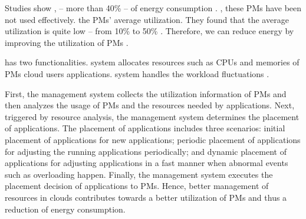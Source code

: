 Studies show \cite{Barroso:2007jt, Shen:2015hm},   -- more than 40\% -- of energy consumption . ,
these PMs have been not used effectively. the PMs' average utilization. They found that the average utilization is quite low 
-- from 10\% to 50\% \cite{Hameed:2016cmb}.
Therefore, we can reduce energy by improving the utilization of PMs .

has two  functionalities.  system 
allocates resources such as CPUs and memories of PMs  cloud users  applications.  system 
handles the workload fluctuations .  

First, the management system collects the utilization information of PMs and then 
analyzes the usage of PMs and the resources needed by applications. Next, triggered by resource analysis, the management system determines the 
placement of applications. The placement of applications includes three scenarios: initial placement of applications for new applications; periodic placement of applications for adjusting the running applications periodically; 
and dynamic placement of applications for adjusting applications in a fast manner when abnormal events such as overloading happen. Finally, 
the management system executes the placement decision of applications to PMs. Hence, better management of resources 
in clouds contributes towards a better utilization of PMs and thus a reduction of energy consumption.


